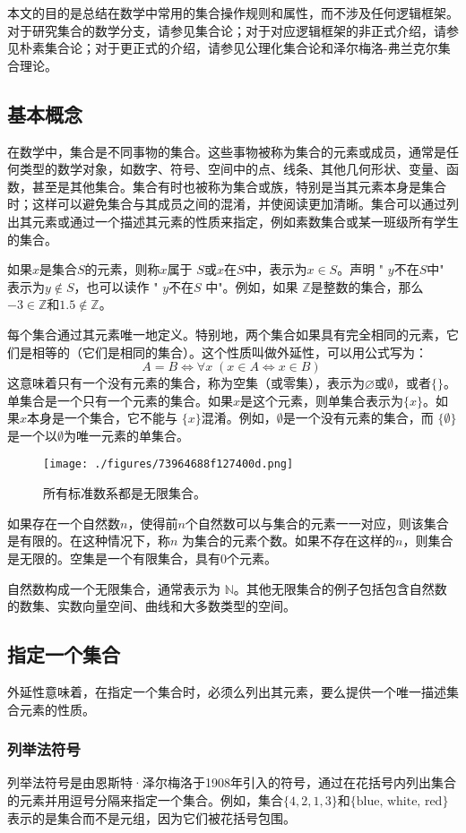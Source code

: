 本文的目的是总结在数学中常用的集合操作规则和属性，而不涉及任何逻辑框架。对于研究集合的数学分支，请参见集合论；对于对应逻辑框架的非正式介绍，请参见朴素集合论；对于更正式的介绍，请参见公理化集合论和泽尔梅洛-弗兰克尔集合理论。
\subsection{基本概念}
在数学中，集合是不同事物的集合。这些事物被称为集合的元素或成员，通常是任何类型的数学对象，如数字、符号、空间中的点、线条、其他几何形状、变量、函数，甚至是其他集合。集合有时也被称为集合或族，特别是当其元素本身是集合时；这样可以避免集合与其成员之间的混淆，并使阅读更加清晰。集合可以通过列出其元素或通过一个描述其元素的性质来指定，例如素数集合或某一班级所有学生的集合。

如果\( x \)是集合\( S \)的元素，则称\( x \)属于 \( S \)或\( x \)在\( S \)中，表示为\( x \in S \)。声明 " \( y \)不在\( S \)中" 表示为\( y \notin S \)，也可以读作 " \( y \)不在\( S \) 中"。例如，如果 \( \mathbb{Z} \)是整数的集合，那么\( -3 \in \mathbb{Z} \)和\( 1.5 \notin \mathbb{Z} \)。

每个集合通过其元素唯一地定义。特别地，两个集合如果具有完全相同的元素，它们是相等的（它们是相同的集合）。这个性质叫做外延性，可以用公式写为：
\[
A = B \iff \forall x\; (x \in A \iff x \in B)~
\]
这意味着只有一个没有元素的集合，称为空集（或零集），表示为\( \varnothing \)或\( \emptyset \)，或者\( \{\} \)。单集合是一个只有一个元素的集合。如果\( x \)是这个元素，则单集合表示为\( \{x\} \)。如果\( x \)本身是一个集合，它不能与 \( \{x\} \)混淆。例如，\( \emptyset \)是一个没有元素的集合，而 \( \{\emptyset\} \)是一个以\( \emptyset \)为唯一元素的单集合。
\begin{figure}[ht]
\centering
\texttt{[image: ./figures/73964688f127400d.png]}
\caption{所有标准数系都是无限集合。} \label{fig_JHSX_3}
\end{figure}
如果存在一个自然数\( n \)，使得前\( n \)个自然数可以与集合的元素一一对应，则该集合是有限的。在这种情况下，称\( n \) 为集合的元素个数。如果不存在这样的\( n \)，则集合是无限的。空集是一个有限集合，具有\( 0 \)个元素。

自然数构成一个无限集合，通常表示为 \( \mathbb{N} \)。其他无限集合的例子包括包含自然数的数集、实数向量空间、曲线和大多数类型的空间。
\subsection{指定一个集合}
外延性意味着，在指定一个集合时，必须么列出其元素，要么提供一个唯一描述集合元素的性质。
\subsubsection{列举法符号}
列举法符号是由恩斯特·泽尔梅洛于1908年引入的符号，通过在花括号内列出集合的元素并用逗号分隔来指定一个集合。例如，集合\( \{4, 2, 1, 3\} \)和\( \{\text{blue, white, red}\} \)表示的是集合而不是元组，因为它们被花括号包围。

